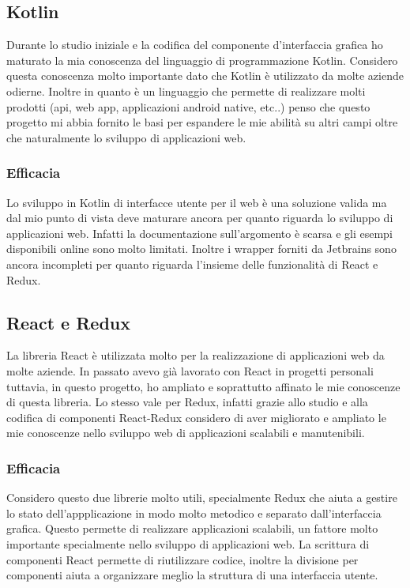 \subsection{Kotlin}
Durante lo studio iniziale e la codifica del componente d'interfaccia grafica ho maturato la mia conoscenza del linguaggio di programmazione Kotlin. Considero questa conoscenza molto importante dato che Kotlin è utilizzato da molte aziende odierne. Inoltre in quanto è un linguaggio che permette di realizzare molti prodotti (api, web app, applicazioni android native, etc..) penso che questo progetto mi abbia fornito le basi per espandere le mie abilità su altri campi oltre che naturalmente lo sviluppo di applicazioni web.

\subsubsection*{Efficacia}
Lo sviluppo in Kotlin di interfacce utente per il web è una soluzione valida ma dal mio punto di vista deve maturare ancora per quanto riguarda lo sviluppo di applicazioni web. Infatti la documentazione sull'argomento è scarsa e gli esempi disponibili online sono molto limitati. Inoltre i wrapper forniti da Jetbrains sono ancora incompleti per quanto riguarda l'insieme delle funzionalità di React e Redux.

\subsection{React e Redux}
La libreria React è utilizzata molto per la realizzazione di applicazioni web da molte aziende. In passato avevo già lavorato con React in progetti personali tuttavia, in questo progetto, ho ampliato e soprattutto affinato le mie conoscenze di questa libreria. Lo stesso vale per Redux, infatti grazie allo studio e alla codifica di componenti React-Redux considero di aver migliorato e ampliato le mie conoscenze nello sviluppo web di applicazioni scalabili e manutenibili.

\subsubsection*{Efficacia}
Considero questo due librerie molto utili, specialmente Redux che aiuta a gestire lo stato dell'appplicazione in modo molto metodico e separato dall'interfaccia grafica. Questo permette di realizzare applicazioni scalabili, un fattore molto importante specialmente nello sviluppo di applicazioni web. La scrittura di componenti React permette di riutilizzare codice, inoltre la divisione per componenti aiuta a organizzare meglio la struttura di una interfaccia utente.

